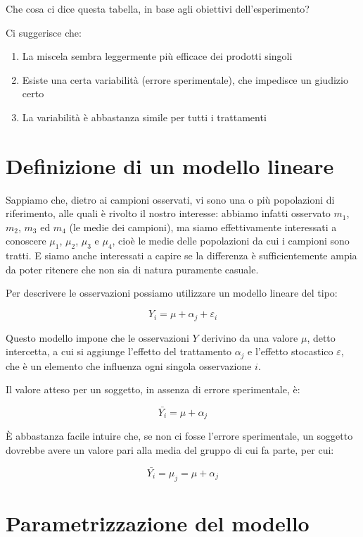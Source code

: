 \documentclass[a4paper,12pt,oneside]{book}
\providecommand{\tightlist}{%
  \setlength{\itemsep}{0pt}\setlength{\parskip}{0pt}}
\begin{document}
Che cosa ci dice questa tabella, in base agli obiettivi dell'esperimento?

Ci suggerisce che:

\begin{enumerate}
\def\labelenumi{\arabic{enumi}.}
\tightlist
\item
  La miscela sembra leggermente più efficace dei prodotti singoli
\item
  Esiste una certa variabilità (errore sperimentale), che impedisce un giudizio certo
\item
  La variabilità è abbastanza simile per tutti i trattamenti
\end{enumerate}

\hypertarget{definizione-di-un-modello-lineare}{%
\section{Definizione di un modello lineare}\label{definizione-di-un-modello-lineare}}

Sappiamo che, dietro ai campioni osservati, vi sono una o più popolazioni di riferimento, alle quali è rivolto il nostro interesse: abbiamo infatti osservato \(m_1\), \(m_2\), \(m_3\) ed \(m_4\) (le medie dei campioni), ma siamo effettivamente interessati a conoscere \(\mu_1\), \(\mu_2\), \(\mu_3\) e \(\mu_4\), cioè le medie delle popolazioni da cui i campioni sono tratti. E siamo anche interessati a capire se la differenza è sufficientemente ampia da poter ritenere che non sia di natura puramente casuale.

Per descrivere le osservazioni possiamo utilizzare un modello lineare del tipo:

\[Y_i = \mu + \alpha_j + \varepsilon_i\]

Questo modello impone che le osservazioni \(Y\) derivino da una valore \(\mu\), detto intercetta, a cui si aggiunge l'effetto del trattamento \(\alpha_j\) e l'effetto stocastico \(\varepsilon\), che è un elemento che influenza ogni singola osservazione \(i\).

Il valore atteso per un soggetto, in assenza di errore sperimentale, è:

\[\bar{Y_i} = \mu + \alpha_j\]

È abbastanza facile intuire che, se non ci fosse l'errore sperimentale, un soggetto dovrebbe avere un valore pari alla media del gruppo di cui fa parte, per cui:

\[\bar{Y_i} = \mu_j = \mu + \alpha_j\]

\hypertarget{parametrizzazione-del-modello}{%
\section{Parametrizzazione del modello}\label{parametrizzazione-del-modello}}
\end{document}
